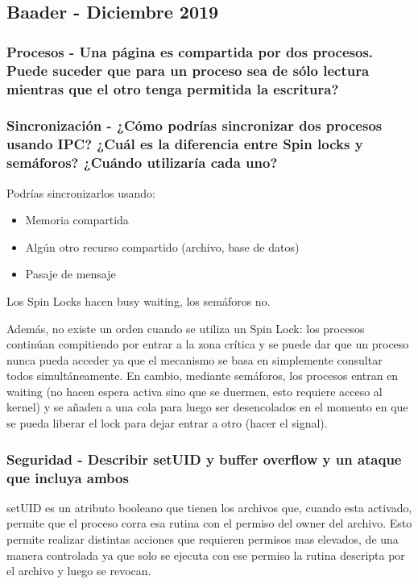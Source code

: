\subsection{Baader - Diciembre 2019}
\subsubsection{Procesos - Una página es compartida por dos procesos. Puede suceder que para un proceso sea de sólo lectura mientras que el otro tenga permitida la escritura?}

\subsubsection{Sincronización - ¿Cómo podrías sincronizar dos procesos usando IPC? ¿Cuál es la diferencia entre Spin locks y semáforos? ¿Cuándo utilizaría cada uno?}

Podrías sincronizarlos usando:
\begin{itemize}
\item Memoria compartida \\
\item Algún otro recurso compartido (archivo, base de datos) \\
\item Pasaje de mensaje
\end{itemize}

Los Spin Locks hacen busy waiting, los semáforos no. 

Además, no existe un orden cuando se utiliza un Spin Lock: los procesos continúan compitiendo por entrar a la zona crítica y se puede dar que un proceso nunca pueda acceder ya que el mecanismo se basa en simplemente consultar todos simultáneamente. En cambio, mediante semáforos, los procesos entran en waiting (no hacen espera activa sino que se duermen, esto requiere acceso al kernel) y se añaden a una cola para luego ser desencolados en el momento en que se pueda liberar el lock para dejar entrar a otro (hacer el signal).

\subsubsection{Seguridad - Describir setUID y buffer overflow y un ataque que incluya ambos}

setUID es un atributo booleano que tienen los archivos que, cuando esta activado, permite que el proceso corra esa rutina con el permiso del owner del archivo. Esto permite realizar distintas acciones que requieren permisos mas elevados, de una manera controlada ya que solo se ejecuta con ese permiso la rutina descripta por el archivo y luego se revocan.

